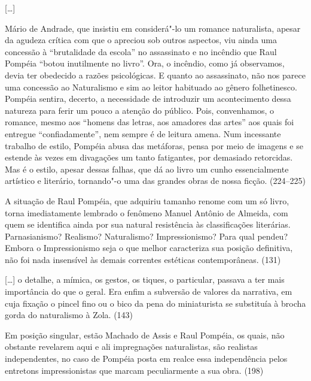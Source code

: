 [\ldots]

Mário de Andrade, que insistiu em considerá"-lo um romance naturalista,
apesar da agudeza crítica com que o apreciou sob outros aspectos, viu
ainda uma concessão à ``brutalidade da escola'' no assassinato e no
incêndio que Raul Pompéia ``botou inutilmente no livro''. Ora, o
incêndio, como já observamos, devia ter obedecido a razões
psicológicas. E quanto ao assassinato, não nos parece uma concessão ao
Naturalismo e sim ao leitor habituado ao gênero folhetinesco. Pompéia
sentira, decerto, a necessidade de introduzir um acontecimento dessa
natureza para ferir um pouco a atenção do público. Pois, convenhamos, o
romance, mesmo aos ``homens das letras, aos amadores das artes'' aos
quais foi entregue ``confiadamente'', nem sempre é de leitura amena. Num
incessante trabalho de estilo, Pompéia abusa das metáforas, pensa por
meio de imagens e se estende às vezes em divagações um tanto
fatigantes, por demasiado retorcidas. Mas é o estilo, apesar dessas
falhas, que dá ao livro um cunho essencialmente artístico e literário,
tornando"-o uma das grandes obras de nossa ficção. (224--225)



A situação de Raul Pompéia, que adquiriu tamanho renome com um só livro,
torna imediatamente lembrado o fenômeno Manuel Antônio de Almeida, com
quem se identifica ainda por sua natural resistência às classificações
literárias. Parnasianismo? Realismo? Naturalismo? Impressionismo? Para
qual pendeu? Embora o Impressionismo seja o que melhor caracteriza sua
posição definitiva, não foi nada insensível às demais correntes
estéticas contemporâneas. (131)

[\ldots] o detalhe, a mímica, os gestos, os tiques, o particular, passava a
ter mais importância do que o geral. Era enfim a subversão de valores
da narrativa, em cuja fixação o pincel fino ou o bico da pena do
miniaturista se substituía à brocha gorda do naturalismo à Zola. (143)



Em posição singular, estão Machado de Assis e Raul Pompéia, os quais,
não obstante revelarem aqui e ali impregnações naturalistas, são
realistas independentes, no  caso de Pompéia posta em realce essa
independência pelos entretons impressionistas que marcam peculiarmente
a sua obra.  (198)

